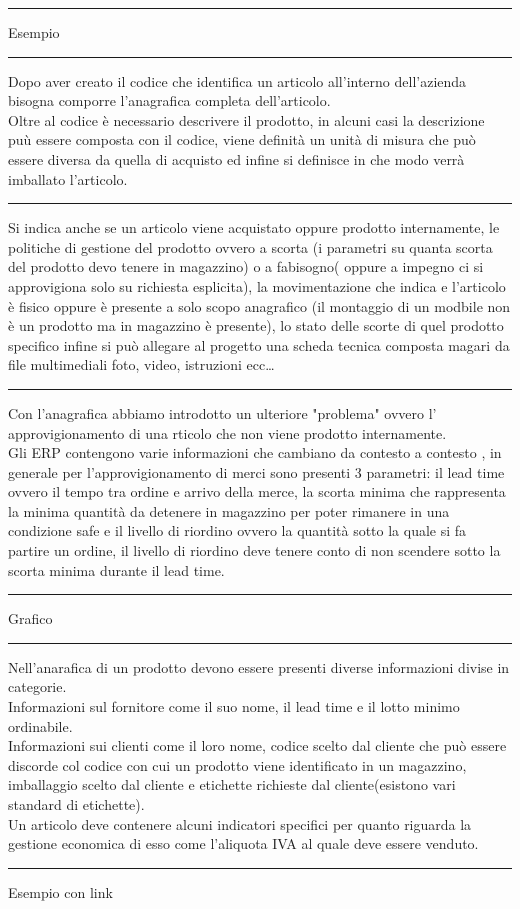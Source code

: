 \documentclass[a4paper]{article}
\newcommand{\cambioSlide}{\vspace{1em} \hrule \vspace{1em}}
\begin{document}
	\cambioSlide
	Esempio
	\cambioSlide
	Dopo aver creato il codice che identifica un articolo all'interno dell'azienda bisogna comporre l'anagrafica completa dell'articolo.\\
	Oltre al codice è necessario descrivere il prodotto, in alcuni casi la descrizione puù essere composta con il codice, viene definità un unità di misura che può essere diversa da quella di acquisto ed infine si definisce in che modo verrà imballato l'articolo.
	\cambioSlide
	Si indica anche se un articolo viene acquistato oppure prodotto internamente, le politiche di gestione del prodotto ovvero a scorta (i  parametri su quanta scorta del prodotto devo tenere in magazzino) o a fabisogno( oppure a impegno ci si approvigiona solo su richiesta esplicita), la movimentazione che indica e l'articolo è fisico oppure è presente a solo scopo anagrafico (il montaggio di un modbile non è un prodotto ma in magazzino è presente), lo stato delle scorte di quel prodotto specifico infine si può allegare al progetto una scheda tecnica composta magari da file multimediali foto, video, istruzioni ecc\dots
	\cambioSlide
	Con l'anagrafica abbiamo introdotto un ulteriore "problema" ovvero l' approvigionamento di una rticolo che non viene prodotto internamente.\\
	Gli ERP contengono varie informazioni che cambiano da contesto a contesto , in generale per l'approvigionamento di merci sono presenti 3 parametri: il lead time ovvero il tempo tra ordine e arrivo della merce, la scorta minima che rappresenta la minima quantità da detenere in magazzino per poter rimanere in una condizione safe e il livello di riordino ovvero la quantità sotto la quale si fa partire un ordine, il livello di riordino deve tenere conto di non scendere sotto la scorta minima durante il lead time.
	\cambioSlide
	Grafico
	\cambioSlide
	Nell'anarafica di un prodotto devono essere presenti diverse informazioni divise in categorie.\\
	Informazioni sul fornitore come il suo nome, il lead time e il lotto minimo ordinabile.\\
	Informazioni sui clienti come il loro nome, codice scelto dal cliente che può essere discorde col codice con cui un prodotto viene identificato in un magazzino, imballaggio scelto dal cliente e etichette richieste dal cliente(esistono vari standard di etichette).\\
	Un articolo deve contenere alcuni indicatori specifici per quanto riguarda la gestione economica di esso come l'aliquota IVA al quale deve essere venduto.
	\cambioSlide
	Esempio con link
\end{document}
